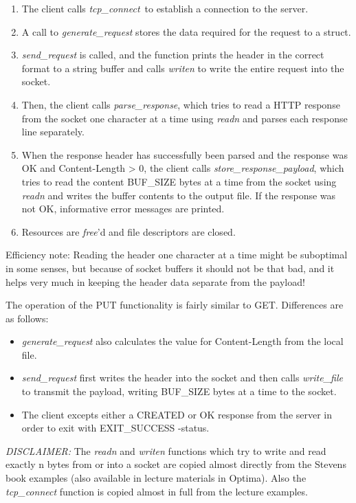 \documentclass[a4paper,12pt]{article}
\begin{document}
\begin{enumerate}
\item The client calls \emph{tcp\_connect} to establish a connection to the server.
\item A call to \emph{generate\_request} stores the data required for the request to a struct.
\item \emph{send\_request} is called, and the function prints the header in the correct format to a string buffer and calls \emph{writen} to write the entire request into the socket.
\item Then, the client calls \emph{parse\_response}, which tries to read a HTTP response from the socket one character at a time using \emph{readn} and parses each response line separately.
\item When the response header has successfully been parsed and the response was OK and Content-Length > 0, the client calls \emph{store\_response\_payload}, which tries to read the content BUF\_SIZE bytes at a time from the socket using \emph{readn} and writes the buffer contents to the output file. If the response was not OK, informative error messages are printed.
\item Resources are \emph{free}'d and file descriptors are closed.
\end{enumerate}

\fussy

Efficiency note: Reading the header one character at a time might be suboptimal in some senses, but because of socket buffers it should not be that bad, and it helps very much in keeping the header data separate from the payload!

The operation of the PUT functionality is fairly similar to GET. Differences are as follows:

\begin{itemize}
\item \emph{generate\_request} also calculates the value for Content-Length from the local file.
\item \emph{send\_request} first writes the header into the socket and then calls \emph{write\_file} to transmit the payload, writing BUF\_SIZE bytes at a time to the socket.
\item The client excepts either a CREATED or OK response from the server in order to exit with EXIT\_SUCCESS -status.
\end{itemize}

\emph{DISCLAIMER:} The \emph{readn} and \emph{writen} functions which try to write and read exactly n bytes from or into a socket are copied almost directly from the Stevens book examples (also available in lecture materials in Optima). Also the \emph{tcp\_connect} function is copied almost in full from the lecture examples.
\end{document}
